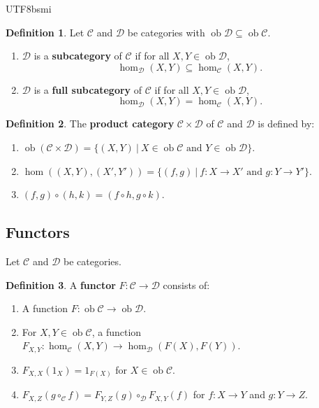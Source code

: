 \documentclass[12pt]{article}
\theoremstyle{definition}
\newtheorem{definition}{Definition}[section]
\newcommand\<{\langle}
\renewcommand\>{\rangle}
\DeclareMathOperator{\ob}{ob}
\begin{document}
\begin{CJK}{UTF8}{bsmi}
\begin{definition}
    Let $\mathcal{C}$ and $\mathcal{D}$ be categories with $\ob\mathcal{D}\subseteq\ob\mathcal{C}$.
    \begin{enumerate}
        \item $\mathcal{D}$ is a \textbf{subcategory} of $\mathcal{C}$ if for all $X, Y\in\ob\mathcal{D}$,
        \[
            \hom_{\mathcal{D}}(X, Y)\subseteq\hom_\mathcal{C}(X, Y).
        \]
        \item $\mathcal{D}$ is a \textbf{full subcategory} of $\mathcal{C}$ if for all $X, Y\in\ob\mathcal{D}$,
        \[
            \hom_{\mathcal{D}}(X, Y)=\hom_\mathcal{C}(X, Y).
        \]
    \end{enumerate}
\end{definition}

\begin{definition}
    The \textbf{product category} $\mathcal{C}\times\mathcal{D}$ of $\mathcal{C}$ and $\mathcal{D}$ is defined by:
    \begin{enumerate}
        \item $\ob(\mathcal{C}\times\mathcal{D})=\{(X, Y)\ |\ X\in\ob\mathcal{C}\text{ and }Y\in\ob\mathcal{D}\}$.
        \item $\hom((X, Y), (X', Y'))=\{(f, g)\ |\ f:X\to X'\text{ and }g:Y\to Y'\}$.
        \item $(f, g)\circ(h, k)=(f\circ h, g\circ k)$.
    \end{enumerate}
\end{definition}

\subsection{Functors}

Let $\mathcal{C}$ and $\mathcal{D}$ be categories.

\begin{definition}
    A \textbf{functor} $F:\mathcal{C}\to\mathcal{D}$ consists of:
    \begin{enumerate}
        \item A function $F:\ob\mathcal{C}\to\ob\mathcal{D}$.
        \item For $X, Y\in\ob\mathcal{C}$, a function $F_{X, Y}:\hom_\mathcal{C}(X, Y)\to\hom_\mathcal{D}(F(X), F(Y))$.
        \item $F_{X, X}(1_X)=1_{F(X)}$ for $X\in\ob\mathcal{C}$.
        \item $F_{X, Z}(g\circ_\mathcal{C} f)=F_{Y, Z}(g)\circ_\mathcal{D}F_{X, Y}(f)$ for $f:X\to Y$ and $g:Y\to Z$.
    \end{enumerate}
\end{definition}


\end{CJK}
\end{document}
